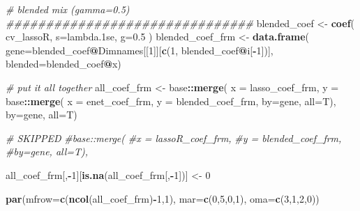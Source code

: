 \documentclass[
]{book}
\newenvironment{Shaded}{\begin{snugshade}}{\end{snugshade}}
\newcommand{\CommentTok}[1]{\textcolor[rgb]{0.56,0.35,0.01}{\textit{#1}}}
\newcommand{\DataTypeTok}[1]{\textcolor[rgb]{0.13,0.29,0.53}{#1}}
\newcommand{\DecValTok}[1]{\textcolor[rgb]{0.00,0.00,0.81}{#1}}
\newcommand{\FloatTok}[1]{\textcolor[rgb]{0.00,0.00,0.81}{#1}}
\newcommand{\KeywordTok}[1]{\textcolor[rgb]{0.13,0.29,0.53}{\textbf{#1}}}
\newcommand{\NormalTok}[1]{#1}
\newcommand{\OperatorTok}[1]{\textcolor[rgb]{0.81,0.36,0.00}{\textbf{#1}}}
\newcommand{\StringTok}[1]{\textcolor[rgb]{0.31,0.60,0.02}{#1}}
\begin{document}
\begin{Shaded}
\begin{Highlighting}[]
\CommentTok{\# blended mix (gamma=0.5)}
\CommentTok{\#\#\#\#\#\#\#\#\#\#\#\#\#\#\#\#\#\#\#\#\#\#\#\#\#\#\#\#\#\#\#}
\NormalTok{blended\_coef <{-}}\StringTok{ }\KeywordTok{coef}\NormalTok{(}
\NormalTok{ cv\_lassoR,}
 \DataTypeTok{s=}\StringTok{\textquotesingle{}lambda.1se\textquotesingle{}}\NormalTok{,}
 \DataTypeTok{g=}\FloatTok{0.5}
\NormalTok{)}
\NormalTok{blended\_coef\_frm <{-}}\StringTok{ }\KeywordTok{data.frame}\NormalTok{(}
 \DataTypeTok{gene=}\NormalTok{blended\_coef}\OperatorTok{@}\NormalTok{Dimnames[[}\DecValTok{1}\NormalTok{]][}\KeywordTok{c}\NormalTok{(}\DecValTok{1}\NormalTok{, blended\_coef}\OperatorTok{@}\NormalTok{i[}\OperatorTok{{-}}\DecValTok{1}\NormalTok{])],}
 \DataTypeTok{blended=}\NormalTok{blended\_coef}\OperatorTok{@}\NormalTok{x)}


\CommentTok{\# put it all together}
\NormalTok{all\_coef\_frm <{-}}\StringTok{ }
\StringTok{ }\NormalTok{base}\OperatorTok{::}\KeywordTok{merge}\NormalTok{(}
 \DataTypeTok{x =}\NormalTok{ lasso\_coef\_frm, }
 \DataTypeTok{y =}\NormalTok{ base}\OperatorTok{::}\KeywordTok{merge}\NormalTok{(}
     \DataTypeTok{x =}\NormalTok{ enet\_coef\_frm,}
     \DataTypeTok{y =}\NormalTok{ blended\_coef\_frm,}
         \DataTypeTok{by=}\StringTok{\textquotesingle{}gene\textquotesingle{}}\NormalTok{, }\DataTypeTok{all=}\NormalTok{T),}
 \DataTypeTok{by=}\StringTok{\textquotesingle{}gene\textquotesingle{}}\NormalTok{, }\DataTypeTok{all=}\NormalTok{T)}

\CommentTok{\# SKIPPED}
\CommentTok{\#base::merge(}
         \CommentTok{\#x = lassoR\_coef\_frm,}
         \CommentTok{\#y = blended\_coef\_frm,}
         \CommentTok{\#by=\textquotesingle{}gene\textquotesingle{}, all=T),}

\NormalTok{all\_coef\_frm[,}\OperatorTok{{-}}\DecValTok{1}\NormalTok{][}\KeywordTok{is.na}\NormalTok{(all\_coef\_frm[,}\OperatorTok{{-}}\DecValTok{1}\NormalTok{])] <{-}}\StringTok{ }\DecValTok{0}

\KeywordTok{par}\NormalTok{(}\DataTypeTok{mfrow=}\KeywordTok{c}\NormalTok{(}\KeywordTok{ncol}\NormalTok{(all\_coef\_frm)}\OperatorTok{{-}}\DecValTok{1}\NormalTok{,}\DecValTok{1}\NormalTok{), }\DataTypeTok{mar=}\KeywordTok{c}\NormalTok{(}\DecValTok{0}\NormalTok{,}\DecValTok{5}\NormalTok{,}\DecValTok{0}\NormalTok{,}\DecValTok{1}\NormalTok{), }\DataTypeTok{oma=}\KeywordTok{c}\NormalTok{(}\DecValTok{3}\NormalTok{,}\DecValTok{1}\NormalTok{,}\DecValTok{2}\NormalTok{,}\DecValTok{0}\NormalTok{))}


\end{Highlighting}
\end{Shaded}
\end{document}
